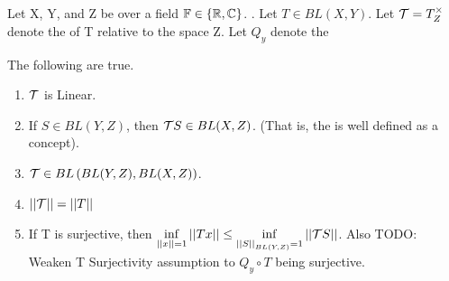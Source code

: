 \begin{prop}[\AdjointOperator]
    \label{prop:adjointoperator}
    Let X, Y, and Z be \SeminormedSpaces
    over a field $\mathbb{F} \in \{\mathbb{R}, \mathbb{C}\}$. .
    Let $T \in BL(X,Y)$. 
    Let $\mathcal{T}=T^\times_Z$ denote the 
    \AdjointOperator of T
    relative to the space Z. 
    Let $Q_y$ denote the \QuotientMap

    The following are true. 
    \begin{enumerate}
        \item $\mathcal{T}$ is Linear. 
        \item If $S \in BL(Y,Z)$, then $\mathcal{T} S \in BL(X,Z)$. (That is, the \AdjointOperator is well defined as a concept).
        \item $\mathcal{T} \in BL\left(  BL(Y,Z), BL(X,Z)\right)$. 
        \item $\left|\left| \mathcal{T} \right|\right|=\left|\left| T \right|\right|$
        \item If T is surjective, then $\inf\limits_{\left|\left| x \right|\right|=1}\left|\left| Tx \right|\right| \leq \inf\limits_{\left|\left| S \right|\right|_{BL(Y,Z)} = 1} \left|\left| \mathcal{T} S \right|\right| $. Also TODO: Weaken T Surjectivity assumption to $Q_y \circ T$ being surjective. 
        
    \end{enumerate}



\end{prop}
